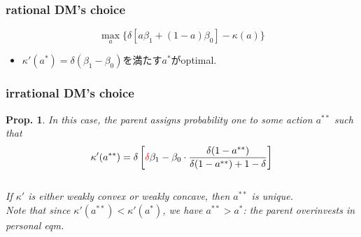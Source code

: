 \documentclass[11pt,a4paper,dvipdfmx]{article}
\theoremstyle{plain}
\newtheorem{prop}{Prop.}[section]
\newcommand{\ocomment}[1]{{\textcolor{red}{#1}}}
\begin{document}
\subsubsection{rational DM's choice}
\[
\max_a \{ \delta [a \beta_1 + (1 - a) \beta_0] - \kappa(a) \}
\]
\begin{itemize}
	\item $\kappa'(a^*) = \delta(\beta_1 - \beta_0)$を満たす$a^*$がoptimal.
\end{itemize}

\subsubsection{irrational DM's choice}
\begin{screen}
\begin{prop} \label{prop eg2}
	In this case, the parent assigns probability one to some action $a^{**}$ such that
	\[
	\kappa'(a^{**}) = \delta \left[
	\ocomment{\delta} \beta_1 - \beta_0 \cdot \frac{\delta(1 - a^{**})}{\delta(1 - a^{**}) + 1 - \delta}
	\right]
	\]
	\\
	If $\kappa'$ is either weakly convex or weakly concave, then $a^{**}$ is unique. \\
	Note that since $\kappa'(a^{**}) < \kappa'(a^*)$, we have $a^{**} > a^*$: the parent overinvests in personal eqm.
\end{prop}
\end{screen}
\end{document}

